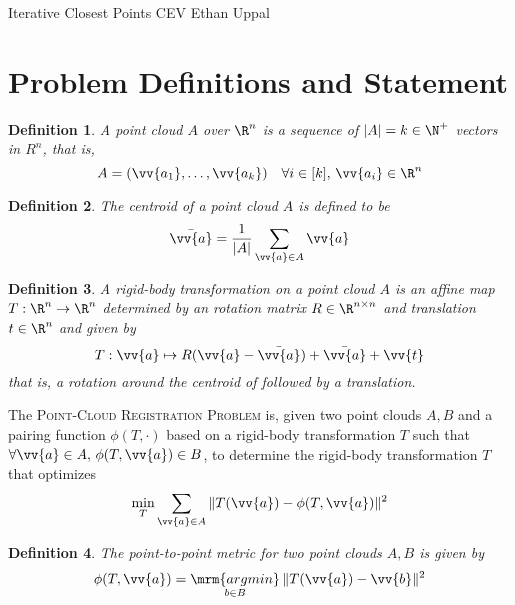 \documentclass[12pt]{article}
\theoremstyle{defstyle}
\newtheorem{defn}{Definition}
\begin{document}
\begin{generic}
    Iterative Closest Points \hfill CEV \vbar Ethan Uppal
\end{generic}

\section{Problem Definitions and Statement}

\begin{defn}
    A \emph{point cloud} $A$ over $\R^n$ is a sequence of $|A| = k \in \N^+$ vectors in $R^n$, that is,
    \[
        A = (\vv{a_1}, \dots, \vv{a_k}) \quad \forall i \in [k],\, \vv{a_i} \in \R^n
    \]
\end{defn}

\begin{defn}
    The \emph{centroid} of a point cloud $A$ is defined to be
    \[
        \bar{\vv{a}} = \frac{1}{|A|} \sum_{\vv{a} \in A} \vv{a}
    \]
\end{defn}

\begin{defn}
    A \emph{rigid-body transformation} on a point cloud $A$ is an affine map $T : \R^n \to \R^n$ determined by an rotation matrix $R \in \R^{n \times n}$ and translation $t \in \R^n$ and given by
    \[
        T : \vv{a} \mapsto R(\vv{a} - \bar{\vv{a}}) + \bar{\vv{a}} + \vv{t}
    \]
    that is, a rotation around the centroid of followed by a translation.
\end{defn}

\begin{outline}
    The \textsc{Point-Cloud Registration Problem} is, given two point clouds $A, B$ and a pairing function $\phi(T, \cdot)$ based on a rigid-body transformation $T$ such that $\forall \vv{a} \in A,\, \phi(T, \vv{a}) \in B$, to determine the rigid-body transformation $T$ that optimizes
    \begin{equation}\label{icp}
        \min\limits_{\substack{T}} \sum_{\vv{a} \in A} \| T(\vv{a}) - \phi(T, \vv{a}) \|^2
    \end{equation}
\end{outline}

\begin{defn}
    The \emph{point-to-point metric} for two point clouds $A, B$ is given by
    \begin{equation}
        \phi(T, \vv{a}) = \mathop{\mrm{argmin}}\limits_{\substack{b \in B}} \| T(\vv{a}) - \vv{b} \|^2
    \end{equation}
\end{defn}
\end{document}
